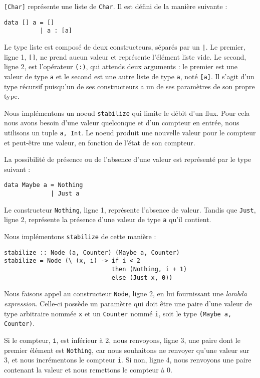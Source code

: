 \documentclass{llncs}
\begin{document}
\lstinline{[Char]} représente une liste de \lstinline{Char}.
Il est défini de la manière suivante :
\begin{lstlisting}
data [] a = []
          | a : [a]
\end{lstlisting}

Le type liste est composé de deux constructeurs, séparés par un \lstinline{|}.
Le premier, ligne 1, \lstinline{[]}, ne prend aucun valeur et représente l'élément
liste vide.
Le second, ligne 2, est l'opérateur \lstinline{(:)}, qui attends deux arguments :
le premier est une valeur de type \lstinline{a} et le second est une autre liste de
type \lstinline{a}, noté \lstinline{[a]}.
Il s'agit d'un type récursif puisqu'un de ses constructeurs a un de ses paramètres
de son propre type.

Nous implémentons un noeud \lstinline{stabilize} qui limite le débit d'un flux.
Pour cela nous avons besoin d'une valeur quelconque et d'un compteur en entrée,
nous utilisons un tuple \lstinline{a, Int}.
Le noeud produit une nouvelle valeur pour le compteur et peut-être une valeur,
en fonction de l'état de son compteur.

La possibilité de présence ou de l'absence d'une valeur est représenté par le type
suivant :

\begin{lstlisting}
data Maybe a = Nothing
             | Just a
\end{lstlisting}

Le constructeur \lstinline{Nothing}, ligne 1, représente l'absence de valeur.
Tandis que \lstinline{Just}, ligne 2, représente la présence d'une valeur de type
\lstinline{a} qu'il contient.

Nous implémentons \lstinline{stabilize} de cette manière :
\begin{lstlisting}
stabilize :: Node (a, Counter) (Maybe a, Counter)
stabilize = Node (\ (x, i) -> if i < 2
                              then (Nothing, i + 1)
                              else (Just x, 0))
\end{lstlisting}

Nous faisons appel au constructeur \lstinline{Node}, ligne 2, en lui fournissant
une \emph{lambda expression}.
Celle-ci possède un paramètre qui doit être une paire d'une valeur de type arbitraire
nommée \lstinline{x} et un \lstinline{Counter} nommé \lstinline{i}, soit le type
\lstinline{(Maybe a, Counter)}.

Si le compteur, \lstinline{i}, est inférieur à 2, nous renvoyons, ligne 3,
une paire dont le premier élément est \lstinline{Nothing}, car nous souhaitons
ne renvoyer qu'une valeur sur 3, et nous incrémentons le compteur \lstinline{i}.
Si non, ligne 4, nous renvoyons une paire contenant la valeur et nous remettons
le compteur à 0.
\end{document}
